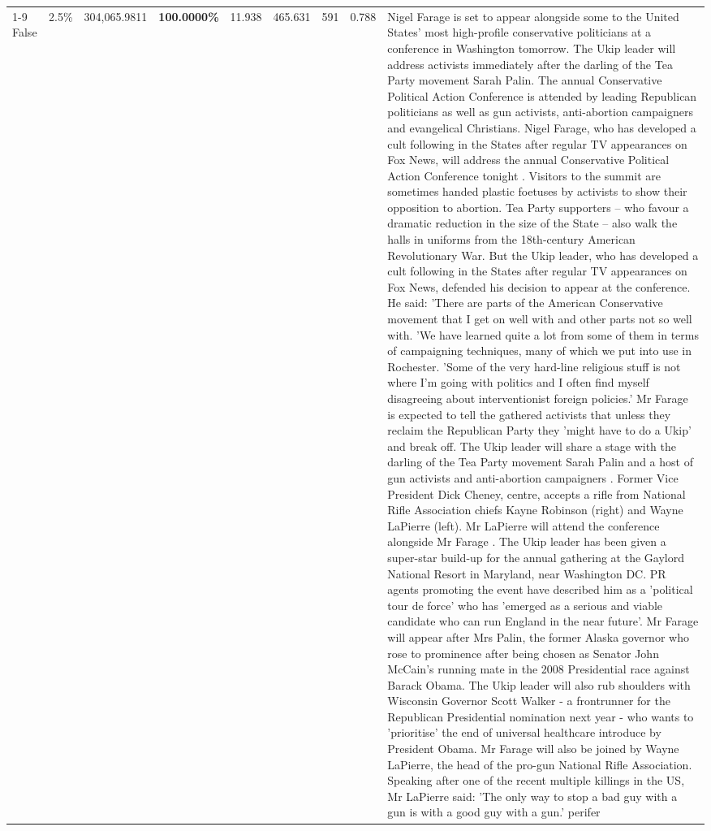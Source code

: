 \begin{table}[H]
\begin{tabular}{lllrlllll}
\cline{1-9}
False & 2.5\% & 304,065.9811 & \bfseries \color{red} 100.0000\% & 11.938 & 465.631 & 591 & 0.788 & Nigel Farage is set to appear alongside some to the United States' most high-profile conservative politicians at a conference in Washington tomorrow. The Ukip leader will address activists immediately after the darling of the Tea Party movement Sarah Palin. The annual Conservative Political Action Conference is attended by leading Republican politicians as well as gun activists, anti-abortion campaigners and evangelical Christians. Nigel Farage, who has developed a cult following in the States after regular TV appearances on Fox News, will address the annual Conservative Political Action Conference tonight . Visitors to the summit are sometimes handed plastic foetuses by activists to show their opposition to abortion. Tea Party supporters – who favour a dramatic reduction in the size of the State – also walk the halls in uniforms from the 18th-century American Revolutionary War. But the Ukip leader, who has developed a cult following in the States after regular TV appearances on Fox News, defended his decision to appear at the conference. He said: 'There are parts of the American Conservative movement that I get on well with and other parts not so well with. 'We have learned quite a lot from some of them in terms of campaigning techniques, many of which we put into use in Rochester. 'Some of the very hard-line religious stuff is not where I'm going with politics and I often find myself disagreeing about interventionist foreign policies.' Mr Farage is expected to tell the gathered activists that unless they reclaim the Republican Party they 'might have to do a Ukip' and break off. The Ukip leader will share a stage with the darling of the Tea Party movement Sarah Palin and a host of gun activists and anti-abortion campaigners . Former Vice President Dick Cheney, centre, accepts a rifle from National Rifle Association chiefs Kayne Robinson (right) and Wayne LaPierre (left). Mr LaPierre will attend the conference alongside Mr Farage . The Ukip leader has been given a super-star build-up for the annual gathering at the Gaylord National Resort in Maryland, near Washington DC. PR agents promoting the event have described him as a 'political tour de force' who has 'emerged as a serious and viable candidate who can run England in the near future'. Mr Farage will appear after Mrs Palin, the former Alaska governor who rose to prominence after being chosen as Senator John McCain's running mate in the 2008 Presidential race against Barack Obama. The Ukip leader will also rub shoulders with Wisconsin Governor Scott Walker - a frontrunner for the Republican Presidential nomination next year - who wants to 'prioritise' the end of universal healthcare introduce by President Obama. Mr Farage will also be joined by Wayne LaPierre, the head of the pro-gun National Rifle Association. Speaking after one of the recent multiple killings in the US, Mr LaPierre said: 'The only way to stop a bad guy with a gun is with a good guy with a gun.' perifer \\

\end{tabular}
\end{table}
